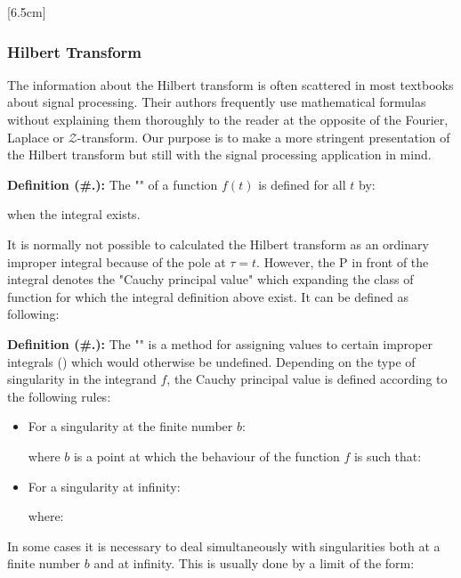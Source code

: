 	
	[6.5cm]
	
	\pagebreak
	\subsubsection{Hilbert Transform}\label{hilbert transform}
	The information about the Hilbert transform is often scattered in most textbooks about signal processing. Their authors frequently use mathematical formulas without explaining them thoroughly to the reader at the opposite of the Fourier, Laplace or $\mathcal{Z}$-transform. Our purpose is to make a more stringent presentation of the Hilbert transform but still with the signal processing application in mind.
	
	\textbf{Definition (\#\thesection.\mydef):} The "" of a function $f(t)$ is defined for all $t$ by:
	
	when the integral exists.
	
	It is normally not possible to calculated the Hilbert transform as an ordinary improper integral because of the pole at $\tau=t$. However, the $\mathrm{P}$ in front of the integral denotes the "Cauchy principal value" which expanding the class of function for which the integral definition above exist. It can be defined as following:
	
	\textbf{Definition (\#\thesection.\mydef):} The "" is a method for assigning values to certain improper integrals () which would otherwise be undefined. Depending on the type of singularity in the integrand $f$, the Cauchy principal value is defined according to the following rules:
	\begin{itemize}
		\item For a singularity at the finite number $b$:
		
		where $b$ is a point at which the behaviour of the function $f$ is such that:
		
	
		\item For a singularity at infinity:
		
		where:
		
	\end{itemize}
	In some cases it is necessary to deal simultaneously with singularities both at a finite number $b$ and at infinity. This is usually done by a limit of the form:
	
